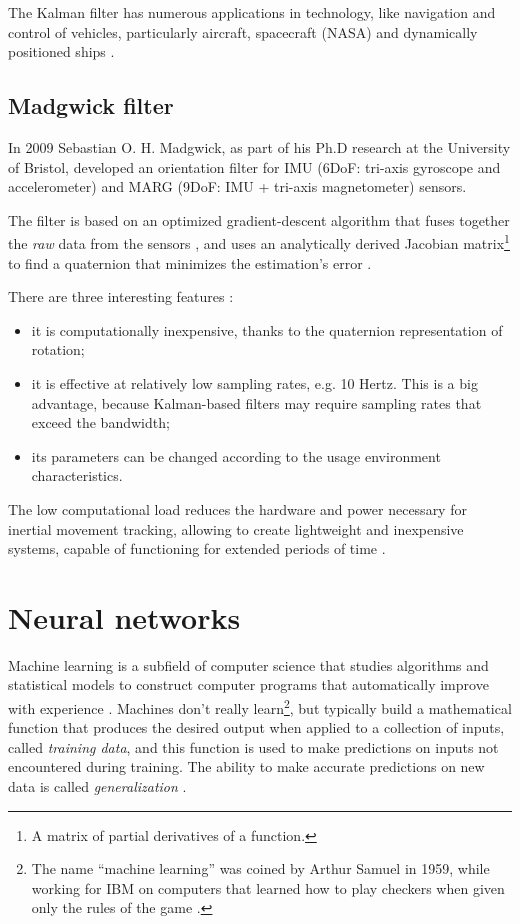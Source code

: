 The Kalman filter has numerous applications in technology, like navigation and control of vehicles, particularly aircraft, spacecraft (NASA) and dynamically positioned ships \cite{Tri83, Fun83}.

\subsection{Madgwick filter} \label{Madgwick filter}
In 2009 Sebastian O. H. Madgwick, as part of his Ph.D research at the University of Bristol, developed an orientation filter for IMU (6DoF: tri-axis gyroscope and accelerometer) and MARG (9DoF: IMU + tri-axis magnetometer) sensors.

The filter is based on an optimized gradient-descent algorithm that fuses together the \textit{raw} data from the sensors \cite{Mad10}, and uses an analytically derived Jacobian matrix\footnote{A matrix of partial derivatives of a function.} to find a quaternion that minimizes the estimation's error \cite{Che12}.
\bigbreak

There are three interesting features \cite{Mad10}:
\begin{itemize}
	\item it is computationally inexpensive, thanks to the quaternion representation of rotation;
	\item it is effective at relatively low sampling rates, e.g. 10 Hertz. This is a big advantage, because Kalman-based filters may require sampling rates that exceed the bandwidth;
	\item its parameters can be changed according to the usage environment characteristics.
\end{itemize}

The low computational load reduces the hardware and power necessary for inertial movement tracking, allowing to create lightweight and inexpensive systems, capable of functioning for extended periods of time \cite{Mad11}.

\section{Neural networks}
Machine learning is a subfield of computer science that studies algorithms and statistical models to construct computer programs that automatically improve with experience \cite{Mit97}. Machines don't really learn\footnote{The name ``machine learning'' was coined by Arthur Samuel in 1959, while working for IBM on computers that learned how to play checkers when given only the rules of the game \cite{Sam59}.}, but typically build a mathematical function that produces the desired output when applied to a collection of inputs, called \textit{training data}, and this function is used to make predictions on inputs not encountered during training. The ability to make accurate predictions on new data is called \textit{generalization} \cite{Hay08}.
\bigbreak

